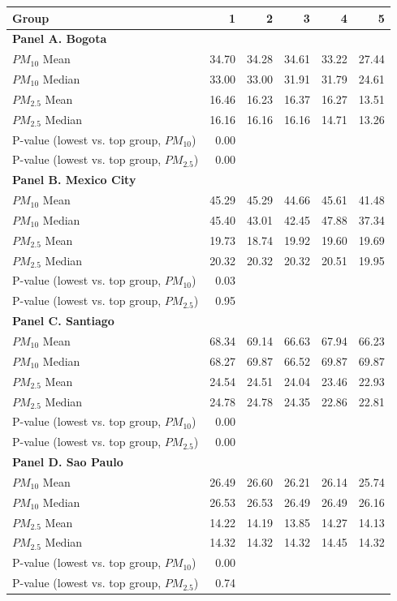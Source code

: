 \begin{tabular}{lrrrrr}
    \toprule
    \toprule
    Group & 1 & 2 & 3 & 4 & 5 \\
    \midrule
    \multicolumn{6}{l}{\textbf{Panel A. Bogota}} \\
    \midrule
    $PM_{10}$ Mean & 34.70 & 34.28 & 34.61 & 33.22 & 27.44 \\
    $PM_{10}$ Median & 33.00 & 33.00 & 31.91 & 31.79 & 24.61 \\
    $PM_{2.5}$ Mean & 16.46 & 16.23 & 16.37 & 16.27 & 13.51 \\
    $PM_{2.5}$ Median & 16.16 & 16.16 & 16.16 & 14.71 & 13.26 \\
    P-value (lowest vs. top group, $PM_{10}$) & 0.00 &  &  &  &  \\
    P-value (lowest vs. top group, $PM_{2.5}$) & 0.00 &  &  &  &  \\
    \midrule
    \multicolumn{6}{l}{\textbf{Panel B. Mexico City}} \\
    \midrule
    $PM_{10}$ Mean & 45.29 & 45.29 & 44.66 & 45.61 & 41.48 \\
    $PM_{10}$ Median & 45.40 & 43.01 & 42.45 & 47.88 & 37.34 \\
    $PM_{2.5}$ Mean & 19.73 & 18.74 & 19.92 & 19.60 & 19.69 \\
    $PM_{2.5}$ Median & 20.32 & 20.32 & 20.32 & 20.51 & 19.95 \\
    P-value (lowest vs. top group, $PM_{10}$) & 0.03 &  &  &  &  \\
    P-value (lowest vs. top group, $PM_{2.5}$) & 0.95 &  &  &  &  \\
    \midrule
    \multicolumn{6}{l}{\textbf{Panel C. Santiago}} \\
    \midrule
    $PM_{10}$ Mean & 68.34 & 69.14 & 66.63 & 67.94 & 66.23 \\
    $PM_{10}$ Median & 68.27 & 69.87 & 66.52 & 69.87 & 69.87 \\
    $PM_{2.5}$ Mean & 24.54 & 24.51 & 24.04 & 23.46 & 22.93 \\
    $PM_{2.5}$ Median & 24.78 & 24.78 & 24.35 & 22.86 & 22.81 \\
    P-value (lowest vs. top group, $PM_{10}$) & 0.00 &  &  &  &  \\
    P-value (lowest vs. top group, $PM_{2.5}$) & 0.00 &  &  &  &  \\
    \midrule
    \multicolumn{6}{l}{\textbf{Panel D. Sao Paulo}} \\
    \midrule
    $PM_{10}$ Mean & 26.49 & 26.60 & 26.21 & 26.14 & 25.74 \\
    $PM_{10}$ Median & 26.53 & 26.53 & 26.49 & 26.49 & 26.16 \\
    $PM_{2.5}$ Mean & 14.22 & 14.19 & 13.85 & 14.27 & 14.13 \\
    $PM_{2.5}$ Median & 14.32 & 14.32 & 14.32 & 14.45 & 14.32 \\
    P-value (lowest vs. top group, $PM_{10}$) & 0.00 &  &  &  &  \\
    P-value (lowest vs. top group, $PM_{2.5}$) & 0.74 &  &  &  &  \\
    \bottomrule
    \bottomrule
\end{tabular}

